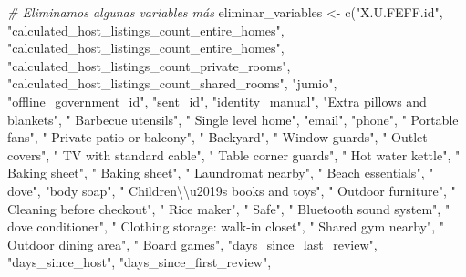 \documentclass[
]{article}
\newenvironment{Shaded}{\begin{snugshade}}{\end{snugshade}}
\newcommand{\CommentTok}[1]{\textcolor[rgb]{0.56,0.35,0.01}{\textit{#1}}}
\newcommand{\FunctionTok}[1]{\textcolor[rgb]{0.00,0.00,0.00}{#1}}
\newcommand{\NormalTok}[1]{#1}
\newcommand{\OtherTok}[1]{\textcolor[rgb]{0.56,0.35,0.01}{#1}}
\newcommand{\SpecialCharTok}[1]{\textcolor[rgb]{0.00,0.00,0.00}{#1}}
\newcommand{\StringTok}[1]{\textcolor[rgb]{0.31,0.60,0.02}{#1}}
\begin{document}
\begin{Shaded}
\begin{Highlighting}[]
\CommentTok{\# Eliminamos algunas variables más}
\NormalTok{eliminar\_variables }\OtherTok{\textless{}{-}} \FunctionTok{c}\NormalTok{(}\StringTok{"X.U.FEFF.id"}\NormalTok{, }\StringTok{"calculated\_host\_listings\_count\_entire\_homes"}\NormalTok{, }
                        \StringTok{"calculated\_host\_listings\_count\_entire\_homes"}\NormalTok{, }\StringTok{"calculated\_host\_listings\_count\_private\_rooms"}\NormalTok{, }
                        \StringTok{"calculated\_host\_listings\_count\_shared\_rooms"}\NormalTok{, }\StringTok{"jumio"}\NormalTok{, }
                        \StringTok{"offline\_government\_id"}\NormalTok{, }\StringTok{"sent\_id"}\NormalTok{, }
                        \StringTok{"identity\_manual"}\NormalTok{, }\StringTok{"Extra pillows and blankets"}\NormalTok{, }
                        \StringTok{" Barbecue utensils"}\NormalTok{, }\StringTok{" Single level home"}\NormalTok{, }
                        \StringTok{"email"}\NormalTok{, }\StringTok{"phone"}\NormalTok{, }
                        \StringTok{" Portable fans"}\NormalTok{, }\StringTok{" Private patio or balcony"}\NormalTok{,}
                        \StringTok{" Backyard"}\NormalTok{, }\StringTok{" Window guards"}\NormalTok{, }
                        \StringTok{" Outlet covers"}\NormalTok{, }\StringTok{" TV with standard cable"}\NormalTok{,}
                        \StringTok{" Table corner guards"}\NormalTok{, }\StringTok{" Hot water kettle"}\NormalTok{, }
                        \StringTok{" Baking sheet"}\NormalTok{, }\StringTok{" Baking sheet"}\NormalTok{, }
                        \StringTok{" Laundromat nearby"}\NormalTok{, }\StringTok{" Beach essentials"}\NormalTok{, }
                        \StringTok{" dove"}\NormalTok{, }\StringTok{"body soap"}\NormalTok{, }
                        \StringTok{" Children}\SpecialCharTok{\textbackslash{}\textbackslash{}}\StringTok{u2019s books and toys"}\NormalTok{, }\StringTok{" Outdoor furniture"}\NormalTok{, }
                        \StringTok{" Cleaning before checkout"}\NormalTok{, }\StringTok{" Rice maker"}\NormalTok{, }
                        \StringTok{" Safe"}\NormalTok{, }\StringTok{" Bluetooth sound system"}\NormalTok{, }\StringTok{" dove conditioner"}\NormalTok{,}
                        \StringTok{" Clothing storage: walk{-}in closet"}\NormalTok{, }\StringTok{" Shared gym nearby"}\NormalTok{,}
                        \StringTok{" Outdoor dining area"}\NormalTok{, }\StringTok{" Board games"}\NormalTok{, }
                        \StringTok{"days\_since\_last\_review"}\NormalTok{, }\StringTok{"days\_since\_host"}\NormalTok{, }\StringTok{"days\_since\_first\_review"}\NormalTok{,}

\end{Highlighting}
\end{Shaded}
\end{document}
